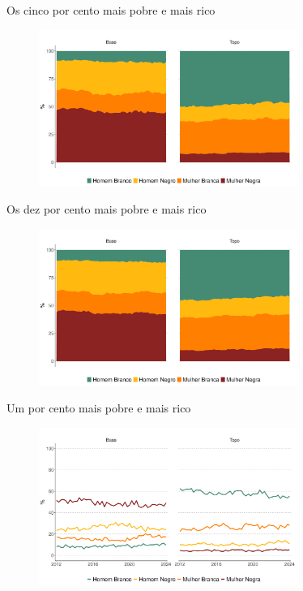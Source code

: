 \documentclass[10pt, xcolor=x11names,compress]{beamer}
\begin{document}
		\begin{frame}{Os cinco por cento mais pobre e mais rico}
		\begin{figure}
			\centering
			\includegraphics[width = 0.75\textwidth]{figures_output/base_topo_5.pdf}
		\end{figure}
	\end{frame}
	
		\begin{frame}{Os dez por cento mais pobre e mais rico}
		\begin{figure}
			\centering
			\includegraphics[width = 0.75\textwidth]{figures_output/base_topo_10.pdf}
		\end{figure}
	\end{frame}
		
		\begin{frame}{Um por cento mais pobre e mais rico}
		\begin{figure}
			\centering
			\includegraphics[width = 0.75\textwidth]{figures_output/base_topo_1_linha.pdf}
		\end{figure}
	\end{frame}
	
\end{document}
